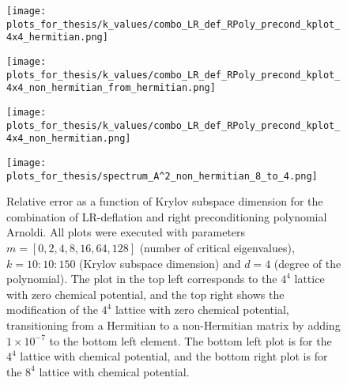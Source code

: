 \begin{figure}[H]
    \centering
    \begin{minipage}{0.45\textwidth}
        \centering
        \texttt{[image: plots\_for\_thesis/k\_values/combo\_LR\_def\_RPoly\_precond\_kplot\_4x4\_hermitian.png]} %
    \end{minipage}%
    \hspace{0.02\textwidth} %
    \begin{minipage}{0.45\textwidth}
        \centering
        \texttt{[image: plots\_for\_thesis/k\_values/combo\_LR\_def\_RPoly\_precond\_kplot\_4x4\_non\_hermitian\_from\_hermitian.png]} %
    \end{minipage}
    
    \vspace{0.02\textwidth} %
    
    \begin{minipage}{0.45\textwidth}
        \centering
        \texttt{[image: plots\_for\_thesis/k\_values/combo\_LR\_def\_RPoly\_precond\_kplot\_4x4\_non\_hermitian.png]} %
    \end{minipage}%
    \hspace{0.02\textwidth} %
    \begin{minipage}{0.45\textwidth}
        \centering
        \texttt{[image: plots\_for\_thesis/spectrum\_A^2\_non\_hermitian\_8\_to\_4.png]} %
    \end{minipage}
    
    \caption{\small Relative error as a function of Krylov subspace dimension for the combination of LR-deflation and right preconditioning polynomial Arnoldi. All plots were executed with parameters $m = [0, 2, 4, 8, 16, 64, 128]$ (number of critical eigenvalues), $k = 10:10:150$ (Krylov subspace dimension) and $d = 4$ (degree of the polynomial). The plot in the top left corresponds to the $4^4$ lattice with zero chemical potential, and the top right shows the modification of the $4^4$ lattice with zero chemical potential, transitioning from a Hermitian to a non-Hermitian matrix by adding $1 \times 10^{-7}$ to the bottom left element. The bottom left plot is for the $4^4$ lattice with chemical potential, and the bottom right plot is for the $8^4$ lattice with chemical potential.}
    \label{fig:combo_LR+right_pre_cond_k_plot}
\end{figure}

